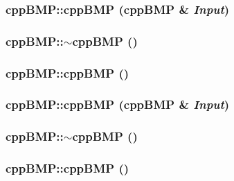 \hypertarget{classcpp_b_m_p_97909a5d65342669eb673dc264600058}{
\subsubsection[{cppBMP}]{\setlength{\rightskip}{0pt plus 5cm}cppBMP::cppBMP ({\bf cppBMP} \& {\em Input})}}
\label{classcpp_b_m_p_97909a5d65342669eb673dc264600058}


\hypertarget{classcpp_b_m_p_ea62579b6a8a25449e108121de524019}{
\subsubsection[{$\sim$cppBMP}]{\setlength{\rightskip}{0pt plus 5cm}cppBMP::$\sim$cppBMP ()}}
\label{classcpp_b_m_p_ea62579b6a8a25449e108121de524019}


\hypertarget{classcpp_b_m_p_dd999f78c5b629a718c9ff82dca1b64a}{
\subsubsection[{cppBMP}]{\setlength{\rightskip}{0pt plus 5cm}cppBMP::cppBMP ()}}
\label{classcpp_b_m_p_dd999f78c5b629a718c9ff82dca1b64a}


\hypertarget{classcpp_b_m_p_97909a5d65342669eb673dc264600058}{
\subsubsection[{cppBMP}]{\setlength{\rightskip}{0pt plus 5cm}cppBMP::cppBMP ({\bf cppBMP} \& {\em Input})}}
\label{classcpp_b_m_p_97909a5d65342669eb673dc264600058}


\hypertarget{classcpp_b_m_p_ea62579b6a8a25449e108121de524019}{
\subsubsection[{$\sim$cppBMP}]{\setlength{\rightskip}{0pt plus 5cm}cppBMP::$\sim$cppBMP ()}}
\label{classcpp_b_m_p_ea62579b6a8a25449e108121de524019}


\hypertarget{classcpp_b_m_p_dd999f78c5b629a718c9ff82dca1b64a}{
\subsubsection[{cppBMP}]{\setlength{\rightskip}{0pt plus 5cm}cppBMP::cppBMP ()}}
\label{classcpp_b_m_p_dd999f78c5b629a718c9ff82dca1b64a}


